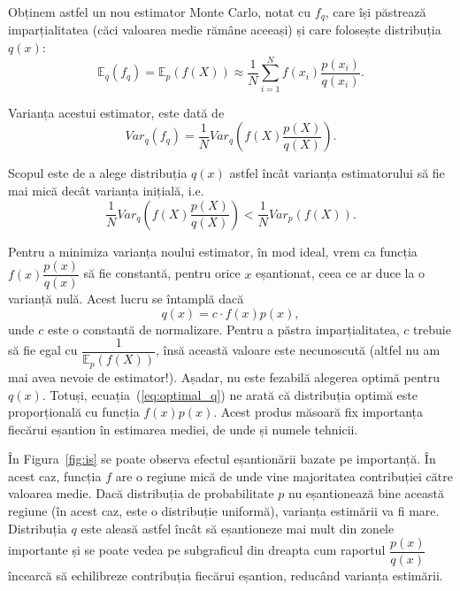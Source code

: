 \documentclass[12pt,a4paper]{report}
\numberwithin{equation}{section} %
\begin{document}
Obținem astfel un nou estimator Monte Carlo, notat cu $f_q$, care își păstrează imparțialitatea
(căci valoarea medie rămâne aceeași) și care folosește distribuția $q(x)$:
\begin{equation}
	\mathbb{E}_q(f_q) = \mathbb{E}_p(f(X)) \approx \frac{1}{N} \sum_{i=1}^{N} f(x_i) \frac{p(x_i)}{q(x_i)}.
\end{equation}

Varianța acestui estimator, este dată de
\begin{equation}
	Var_q(f_q) = \frac{1}{N}Var_q\left(f(X) \frac{p(X)}{q(X)}\right).
\end{equation}

Scopul este de a alege distribuția $q(x)$ astfel încât varianța estimatorului să fie
mai mică decât varianța inițială, i.e.
\begin{equation}
	\frac{1}{N}Var_q\left(f(X) \frac{p(X)}{q(X)}\right) < \frac{1}{N}Var_p(f(X)).
\end{equation}

Pentru a minimiza varianța noului estimator, în mod ideal, vrem ca funcția
$f(x) \dfrac{p(x)}{q(x)}$ să fie constantă, pentru orice $x$ eșantionat, ceea
ce ar duce la o varianță nulă. Acest lucru se întamplă dacă
\begin{equation}\label{eq:optimal_q}
	q(x) = c \cdot f(x)p(x),
\end{equation}
unde $c$ este o constantă de normalizare. Pentru a păstra imparțialitatea, $c$ trebuie
să fie egal cu $\dfrac{1}{\mathbb{E}_p(f(X))}$, însă această valoare este necunoscută
(altfel nu am mai avea nevoie de estimator!). Așadar, nu este fezabilă alegerea
optimă pentru $q(x)$. Totuși, ecuația~(\ref{eq:optimal_q}) ne arată că distribuția
optimă este proporțională cu funcția $f(x)p(x)$. Acest produs măsoară fix
importanța fiecărui eșantion în estimarea mediei, de unde și numele tehnicii.

În Figura~\ref{fig:is} se poate observa efectul eșantionării bazate pe importanță.
În acest caz, funcția $f$ are o regiune mică de unde vine majoritatea contribuției
către valoarea medie. Dacă distribuția de probabilitate $p$ nu eșantionează bine
această regiune (în acest caz, este o distribuție uniformă), varianța estimării
va fi mare. Distribuția $q$ este aleasă astfel încât să eșantioneze mai mult din
zonele importante și se poate vedea pe subgraficul din dreapta cum raportul
$\dfrac{p(x)}{q(x)}$ încearcă să echilibreze contribuția fiecărui eșantion, reducând
varianța estimării.
\end{document}

